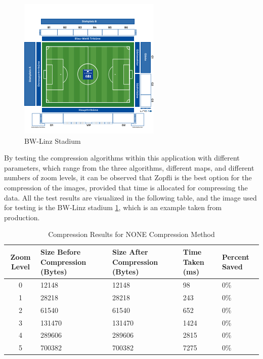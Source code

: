 \begin{figure}
    \centering
    \includegraphics[scale=0.8]{pics/test_stadium.png}
    \caption{BW-Linz Stadium}
    \label{fig:impl:bw-stadium}
\end{figure}

By testing the compression algorithms within this application with different parameters, which range from the three algorithms, different maps, and different numbers of zoom levels, it can be observed that Zopfli is the best option for the compression of the images, provided that time is allocated for compressing the data. All the test results are visualized in the following table, and the image used for testing is the BW-Linz stadium \ref{fig:impl:bw-stadium}, which is an example taken from production.

\begin{table}[H]
    \centering
    \begin{tabularx}{\textwidth}{|c|X|X|X|X|}
        \hline
        \textbf{Zoom Level} & \textbf{Size Before Compression (Bytes)} & \textbf{Size After Compression (Bytes)} & \textbf{Time Taken (ms)} & \textbf{Percent Saved} \\ \hline
        0 & 12148 & 12148 & 98 & 0\% \\ \hline
        1 & 28218 & 28218 & 243 & 0\% \\ \hline
        2 & 61540 & 61540 & 652 & 0\% \\ \hline
        3 & 131470 & 131470 & 1424 & 0\% \\ \hline
        4 & 289606 & 289606 & 2815 & 0\% \\ \hline
        5 & 700382 & 700382 & 7275 & 0\% \\ \hline
    \end{tabularx}
    \caption{Compression Results for NONE Compression Method}
    \label{tab:compression_none}
\end{table}


